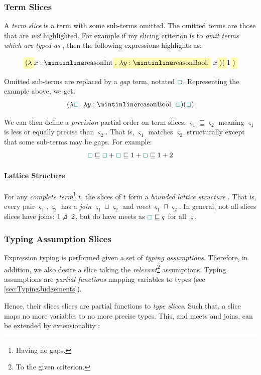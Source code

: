 \subsubsection{Term Slices}
A \textit{term slice} is a term with some sub-terms omitted. The omitted terms are those that are \textit{not} highlighted. For example if my slicing criterion is to \textit{omit terms which are typed as} , then the following expressions highlights as:

\[\hlcmaths[yellow!30]{(\lambda} x: \code{Int}\hlcmaths[yellow!30]{.\ \lambda y : \code{Bool}.}\ x\hlcmaths[yellow!30]{)(}1\hlcmaths[yellow!30]{)}\]


Omitted sub-terms are replaced by a \textit{gap} term, notated ${\color{teal}\Box}$. Representing the example above, we get:
\[(\lambda \gap.\ \lambda y : \code{Bool}.\ \gap)(\gap)\]

We can then define a \textit{precision} partial order \cite{PartialOrder} on term slices: $\varsigma_1 \sqsubseteq \varsigma_2$ meaning $\varsigma_1$ is less or equally precise than $\varsigma_2$. That is, $\varsigma_1$ matches $\varsigma_2$ structurally except that some sub-terms may be gaps. For example:
\[{\color{teal}\Box} \sqsubseteq{\color{teal}\Box} + {\color{teal}\Box}\sqsubseteq 1 + {\color{teal}\Box} \sqsubseteq 1 + 2\]

\paragraph{Lattice Structure}\label{sec:JoinTypesTheory} For any \textit{complete term}\footnote{Having no gaps.} $t$, the slices of $t$ form a \textit{bounded lattice structure} \cite{Lattice}. That is, every pair $\varsigma_1, \varsigma_2$ has a \textit{join} $\varsigma_1 \sqcup \varsigma_2$ and \textit{meet} $\varsigma_1 \sqcap \varsigma_2$. In general, not all slices slices have joins: $1 \centernot\sqcup\ 2$, but do have meets as ${\color{teal}\Box} \sqsubseteq \varsigma$ for all $\varsigma$.
 
\subsubsection{Typing Assumption Slices}
Expression typing is performed given a set of \textit{typing assumptions}. Therefore, in addition, we also desire a slice taking the \textit{relevant}\footnote{To the given criterion.} assumptions. Typing assumptions are \textit{partial functions} mapping variables to types (see \cref{sec:TypingJudgements}). 

Hence, their slices slices are partial functions to \textit{type slices}. Such that, a slice maps no more variables to no more precise types. This, and meets and joins, can be extended by extensionality \cite{Extensionality}:

